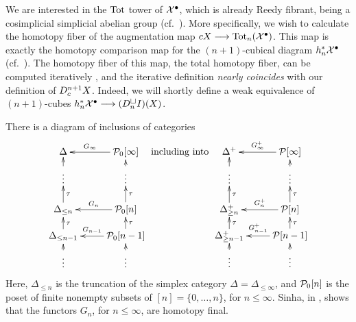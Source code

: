 \documentclass[10pt]{article}
\newcommand{\dupdown}[2]{D^{\smash{#1}}_{\smash{#2}}}
\newcommand{\PuncCube}[1]{\calP_{0}[#1]}
\newcommand{\FullCube}[1]{\calP[#1]}
\newcommand{\TruncSimplex}[1]{{\Delta_{\leq#1}}}
\newcommand{\TruncAugSimplex}[1]{{\Delta^{\smash{+}}_{\smash{\geq#1}}}}
\begin{document}
\begin{convergence}
\begin{shaded}\tiny
We are interested in the $\textup{Tot}$ tower of $\mathcal{X}^\bullet$, which is already Reedy fibrant, being a cosimplicial simplicial abelian group (cf.\ \cite[{X.4.9}]{YellowMonster}).
More specifically, we wish to calculate the homotopy fiber of the augmentation map $cX\longrightarrow\textup{Tot}_{n}(\mathcal{X}^\bullet)$. This map is exactly the homotopy comparison map for the $(n+1)$-cubical diagram $h_{n}^*\mathcal{X}^\bullet$ (cf.\ \cite[\S3]{LuisGoodwillie.pdf}). The homotopy fiber of this map, the total homotopy fiber, can be computed iteratively \cite[Proposition 3.8]{LuisGoodwillie.pdf}, and the iterative definition \emph{nearly coincides} with our definition of $\dupdown{n+1}{c}X$. Indeed, we will shortly define a weak equivalence of $(n+1)$-cubes $h_n^*\mathcal{X}^\bullet\longrightarrow (D_n^{\smash{\square}}I)(X)$.
\end{shaded}


There is a diagram of inclusions of categories
\[\xymatrix@R=4mm{
\Delta&%
\PuncCube{\infty}
\ar[l]_-{G_\infty}
\\%
{\vdots}
\ar[u]
&%
\vdots
\ar[u]
\\%
\TruncSimplex{n}
\ar[u]_-{\tau}
&%
\PuncCube{n}
\ar[u]_-{\tau}
\ar[l]_-{G_n}
\\%
\TruncSimplex{n-1}
\ar[u]_-{\tau}
&%
\PuncCube{n-1}
\ar[u]_-{\tau}
\ar[l]_-{G_{n-1}}
\\%
{\vdots}
\ar[u]
&%
\vdots
\ar[u]
}\textup{ including into }
\xymatrix@R=4mm{
\Delta^+&%
\FullCube{\infty}
\ar[l]_-{G_\infty^+}
\\%
{\vdots}
\ar[u]
&%
\vdots
\ar[u]
\\%
\TruncAugSimplex{n}
\ar[u]_-{\tau}
&%
\FullCube{n}
\ar[u]_-{\tau}
\ar[l]_-{G_n^+}
\\%
\TruncAugSimplex{n-1}
\ar[u]_-{\tau}
&%
\FullCube{n-1}
\ar[u]_-{\tau}
\ar[l]_-{G_{n-1}^+}
\\%
{\vdots}
\ar[u]
&%
\vdots
\ar[u]
}
\]
Here, $\TruncSimplex{n}$ is the truncation of the simplex category $\Delta=\TruncSimplex{\infty}$, and $\PuncCube{n}$ is the poset of finite nonempty subsets of $[n]=\{0,\ldots,n\}$, for $n\leq\infty$.
Sinha, in \cite{SinhaSpacesOfKnots.pdf}, shows that the functors $G_n$, for $n\leq\infty$, are homotopy final.


\end{convergence}
\end{document}
